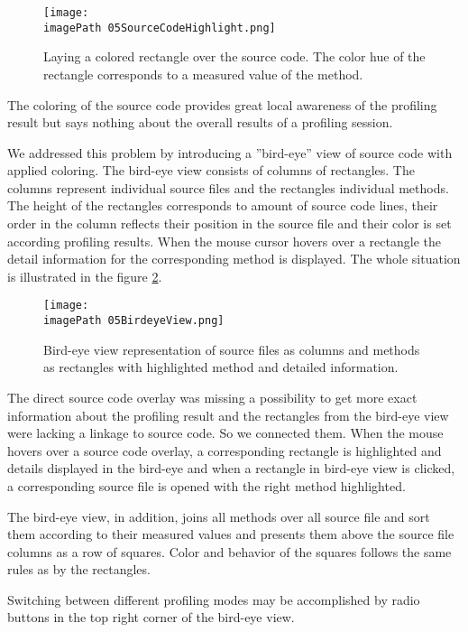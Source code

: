 \begin{figure}
	\centering
		\texttt{[image: \\imagePath 05SourceCodeHighlight.png]}
		\caption{Laying a colored rectangle over the source code. The color hue of the rectangle corresponds to a measured value of the method. }
	\label{fig:05SourceCodeHighlight}
\end{figure}

The coloring of the source code provides great local awareness of the profiling result but says nothing about the overall results of a profiling session. 

We addressed this problem by introducing a ''bird-eye'' view of source code with applied coloring. The bird-eye view consists of columns of rectangles. The columns represent individual source files and the rectangles individual methods. The height of the rectangles corresponds to amount of source code lines, their order in the column reflects their position in the source file and their color is set according profiling results.
When the mouse cursor hovers over a rectangle the detail information for the corresponding method is displayed. The whole situation is illustrated in the figure \ref{fig:05BirdeyeView}.

\begin{figure}
	\centering
		\texttt{[image: \\imagePath 05BirdeyeView.png]}
		\caption{Bird-eye view representation of source files as columns and methods as rectangles with highlighted method and detailed information. }
	\label{fig:05BirdeyeView}
\end{figure}

The direct source code overlay was missing a possibility to get more exact information about the profiling result and the rectangles from the bird-eye view were lacking a linkage to source code. So we connected them. When the mouse hovers over a source code overlay, a corresponding rectangle is highlighted and details displayed in the bird-eye and when a rectangle in bird-eye view is clicked, a corresponding source file is opened  with the right method highlighted. 

The bird-eye view, in addition, joins all methods over all source file and sort them according to their measured values and presents them above the source file columns as a row of squares. Color and behavior of the squares follows the same rules as by the rectangles.

Switching between different profiling modes may be accomplished by radio buttons in the top right corner of the bird-eye view.

